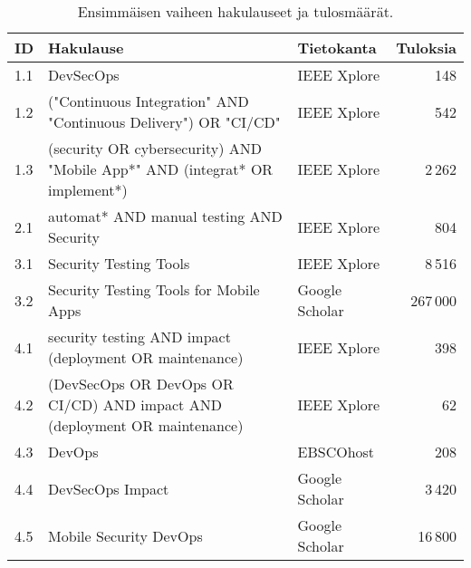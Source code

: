 \documentclass[bscthesis,finnish,oneside,biblatex]{uefcsthesis}
\begin{document}
    \begin{table}[htbp]
        \centering
        \footnotesize  %
        \caption{Ensimmäisen vaiheen hakulauseet ja tulosmäärät.}
        \label{tab:first-phase}
        \begin{tabularx}{\textwidth}{l>{\ttfamily\small\raggedright\arraybackslash}X l r}
            \toprule
            \textbf{ID} &
            \textbf{Hakulause} &
            \textbf{Tietokanta} &
            \textbf{Tuloksia} \\
            \midrule
            1.1 & DevSecOps                                                                                                & IEEE Xplore     & 148     \\
            1.2 & ("Continuous Integration" AND "Continuous Delivery") OR "CI/CD"                                          & IEEE Xplore     & 542     \\
            1.3 & (security OR cybersecurity) AND "Mobile App*" AND (integrat* OR implement*)                              & IEEE Xplore     & 2\,262  \\
            2.1 & automat* AND manual testing AND Security                                                                  & IEEE Xplore     & 804     \\
            3.1 & Security Testing Tools                                                                                   & IEEE Xplore     & 8\,516  \\
            3.2 & Security Testing Tools for Mobile Apps                                                                   & Google Scholar  & 267\,000 \\
            4.1 & security testing AND impact (deployment OR maintenance)                                                  & IEEE Xplore     & 398     \\
            4.2 & (DevSecOps OR DevOps OR CI/CD) AND impact AND (deployment OR maintenance)                                & IEEE Xplore     & 62      \\
            4.3 & DevOps                                                                                                   & EBSCOhost       & 208     \\
            4.4 & DevSecOps Impact                                                                                         & Google Scholar  & 3\,420  \\
            4.5 & Mobile Security DevOps                                                                                   & Google Scholar  & 16\,800 \\
            \bottomrule
        \end{tabularx}
    \end{table}
\end{document}
